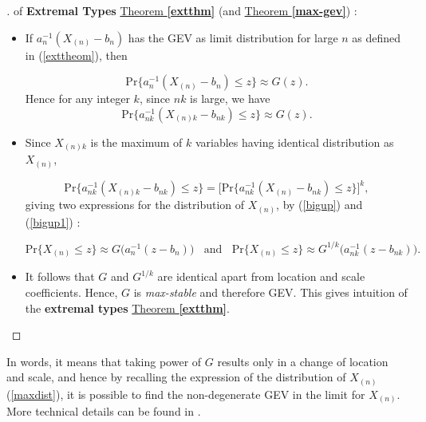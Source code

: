 \begin{proof}[\nopunct ] of \textbf{Extremal Types} \hyperref[extthm]{Theorem \textbf{\ref{extthm}}} (and \hyperref[max-gev]{Theorem \textbf{\ref{max-gev}}}) :
	\vspace{-0.1cm}
\ \ \	\begin{itemize}
    \item	If $a_n^{-1}(X_{(n)}-b_n)$ has the GEV as limit distribution for large $n$ as defined in (\ref{exttheom}), then
	
	\begin{equation*} \label{gevproof1}
	\text{Pr}\Big\{ a_n^{-1}(X_{(n)}-b_n)\leq z\Big\}\approx G(z).
	\end{equation*}
	Hence for any integer $k$, since $nk$ is large, we have
	\begin{equation} \label{bigup}
	\text{Pr}\Big\{ a_{nk}^{-1}(X_{(n)k}-b_{nk})\leq z\Big\}\approx G(z).
	\end{equation}
	
	\item Since $X_{(n)k}$ is the maximum of $k$ variables having identical distribution as $X_{(n)}$,
	
	\begin{equation} \label{bigup1}
	\text{Pr}\Big\{ a_{nk}^{-1}(X_{(n)k}-b_{nk})\leq z\Big\}=\Big[\text{Pr}\big\{ a_{nk}^{-1}(X_{(n)}-b_{nk})\leq z\big\}\Big]^k,
	\end{equation}
	giving two expressions for the distribution of $X_{(n)}$, by (\ref{bigup}) and (\ref{bigup1}) :
	
	\begin{equation*}\label{gevproofl}
	\text{Pr}\{X_{(n)}\leq z\}\approx G\Big(a_n^{-1}(z-b_n)\Big) \ \ \ \ \text{and} \ \ \ \ \text{Pr}\{X_{(n)}\leq z\} \approx G^{1/k}\Big(a_{nk}^{-1}(z-b_{nk})\Big).
	\end{equation*}
	\item It follows that $G$ and $G^{1/k}$ are identical apart from location and scale coefficients. 
	Hence, $G$ is \emph{max-stable} and therefore GEV. This gives intuition of the \textbf{extremal 
	types} \hyperref[extthm]{Theorem \textbf{\ref{extthm}}}.
  \end{itemize}
\vspace{-.3cm}
\end{proof}
In words, it means that taking power of $G$ results only in a change of location and scale, and hence by recalling the expression of the distribution of $X_{(n)}$(\ref{maxdist}), it is possible to find the non-degenerate GEV in the limit for $X_{(n)}$. More technical details can be found in \citet{leadbetter_extremes_1983}.

